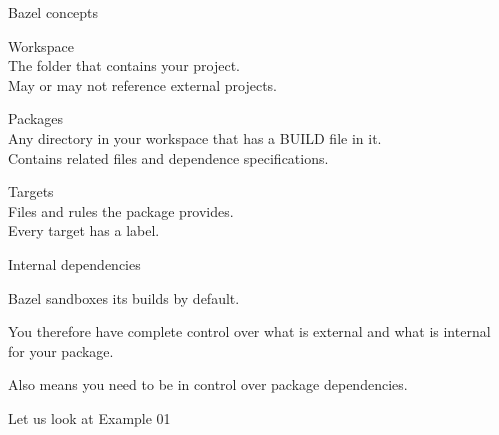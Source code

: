 \documentclass[11pt]{beamer}
\begin{document}
\begin{frame}{Bazel concepts}

  \begin{alertblock}{Workspace} \\[5pt]
    The folder that contains your project.\\
    May or may not reference external projects.
  \end{alertblock}

  \vspace{2mm}

  \begin{alertblock}{Packages} \\[5pt]
    Any directory in your workspace that has a {\ttfamily BUILD} file in it.\\
    Contains related files and dependence specifications.
  \end{alertblock}

  \vspace{2mm}

  \begin{alertblock}{Targets} \\[5pt]
    Files and rules the package provides.\\
    Every target has a label.
  \end{alertblock}

  \BazelNavIcon{}
\end{frame}

\begin{frame}{Internal dependencies}

  \alert{Bazel} sandboxes its builds by default.

  \vspace{5mm}

  You therefore have complete control over what is external and what is internal
  for your package.

  \vspace{5mm}

  Also means you need to be in control over package dependencies.

  \vspace{5mm}

  Let us look at Example 01

  \BazelNavIcon{}
\end{frame}
\end{document}
